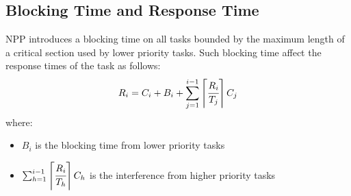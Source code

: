 \subsection{Blocking Time and Response Time}
NPP introduces a blocking time on all tasks bounded by the maximum length of a critical section used by lower priority tasks.
Such blocking time affect the response times of the task as follows:
\[R_i = C_i + B_i + \sum_{j=1}^{i-1} \left\lceil \cfrac{R_i}{T_j} \right\rceil C_j\]
where:
\begin{itemize}
    \item $B_i$ is the blocking time from lower priority tasks
    \item $\sum_{h=1}^{i-1} \left\lceil \cfrac{R_i}{T_h} \right\rceil C_h$ is the interference from higher priority tasks
\end{itemize}
